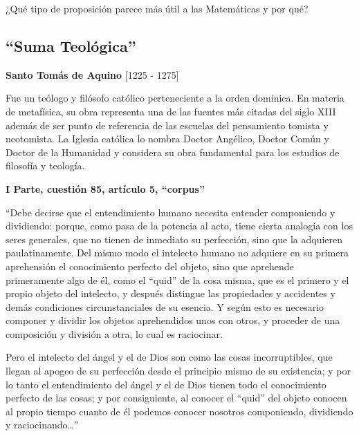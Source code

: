 \documentclass{article}
\begin{document}
\noindent ¿Qué tipo de proposición parece más útil a las Matemáticas y por qué?

\newpage

\subsection{``Suma Teológica''}

\begin{center}
    \large{\textbf{Santo Tomás de Aquino} [1225 - 1275]}
\end{center}
    Fue un teólogo y filósofo católico perteneciente a la orden dominica. En materia de metafísica, su obra representa una de las fuentes más citadas del siglo XIII además de ser punto de referencia de las escuelas del pensamiento tomista y neotomista. La Iglesia católica lo nombra Doctor Angélico, Doctor Común y Doctor de la Humanidad y considera su obra fundamental para los estudios de filosofía y teología. \par
    
    \begin{center}
        \large{\textbf{I Parte, cuestión 85, artículo 5, ``corpus'' }}
    \end{center}
    
    ``Debe decirse que el entendimiento humano necesita entender componiendo y dividiendo: porque, como pasa de la potencia al acto, tiene cierta analogía con los seres generales, que no tienen de inmediato su perfección, sino que la adquieren paulatinamente. Del mismo modo el intelecto humano no adquiere en su primera aprehensión el conocimiento perfecto del objeto, sino que aprehende primeramente algo de él, como el ``quid'' de la cosa misma, que es el primero y el propio objeto del intelecto, y después distingue las propiedades y accidentes y demás condiciones circunstanciales de su esencia. Y según esto es necesario componer y dividir los objetos aprehendidos unos con otros, y proceder de una composición y división a otra, lo cual es raciocinar.\par
    Pero el intelecto del ángel y el de Dios son como las cosas incorruptibles, que llegan al apogeo de su perfección desde el principio mismo de su existencia; y por lo tanto el entendimiento del ángel y el de Dios tienen todo el conocimiento perfecto de las cosas; y por consiguiente, al conocer el ``quid'' del objeto conocen al propio tiempo cuanto de él podemos conocer nosotros componiendo, dividiendo y raciocinando\ldots'' \par
    
\end{document}
